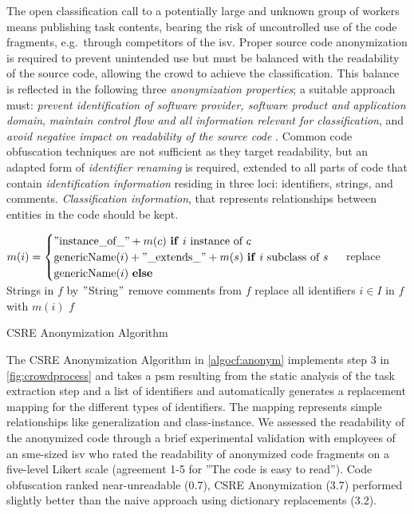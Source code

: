 The open classification call to a potentially large and unknown group of workers means publishing task contents, bearing the risk of uncontrolled use of the code fragments, e.g.~through competitors of the \gls{isv}.
Proper source code anonymization is required to prevent unintended use but must be balanced with the readability of the source code, allowing the crowd to achieve the classification.
This balance is reflected in the following three \emph{anonymization properties}; a suitable approach must: \emph{prevent identification of software provider, software product and application domain}, \emph{maintain control flow and all information relevant for classification}, and \emph{avoid negative impact on readability of the source code} \autocite{Heil2018CSRE,Heil2019CSRECCIS}.
Common code obfuscation techniques are not sufficient as they target readability, but an adapted form of \emph{identifier renaming} is required, extended to all parts of code that contain \emph{identification information} residing in three loci: identifiers, strings, and comments.
\emph{Classification information}, that represents relationships between entities in the code should be kept.

\setlength{\algomargin}{1em} %
\hypertarget{algocf:anonym}{%
\begin{algorithm}
    \DontPrintSemicolon
        $m{(}i{)} = 
        \begin{cases}
        "\text{instance\_of\_}"+m(c) \text{ \textbf{if} }i\text{ instance of }c\\
        \text{genericName}(i)+"\text{\_extends\_}"+ m(s)\text{ \textbf{if} }i\text{ subclass of }s\\
        \text{genericName}(i) \text{ \textbf{else}}
        \end{cases}$\;
        replace Strings in $f$ by $"$String$"$\;
        remove comments from $f$\;
        replace all identifiers $i\in I$ in $f$ with $m(i)$\;
        \Return $f$\;
    \caption{CSRE Anonymization Algorithm}\label{algocf:anonym}
\end{algorithm}}

The CSRE Anonymization Algorithm \autocite{Heil2019CSRECCIS} in \cref{algocf:anonym} implements step 3 in \cref{fig:crowdprocess} and takes a \gls{psm} resulting from the static analysis of the task extraction step and a list of identifiers and automatically generates a replacement mapping for the different types of identifiers.
The mapping represents simple relationships like generalization and class-instance.
We assessed the readability of the anonymized code through a brief experimental validation \autocite{Heil2019CSRECCIS} with employees of an \gls{sme}-sized \gls{isv} who rated the readability of anonymized code fragments on a five-level Likert scale (agreement 1-5 for ''The code is easy to read'').
Code obfuscation ranked near-unreadable (0.7), CSRE Anonymization (3.7) performed slightly better than the naive approach using dictionary replacements (3.2).

